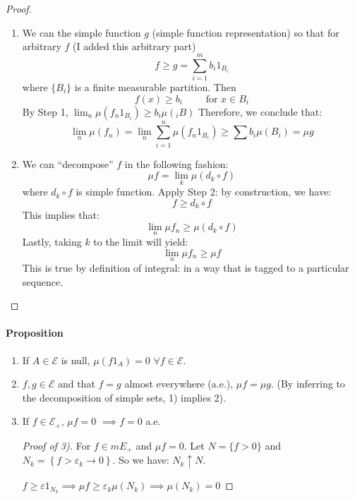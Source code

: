 \documentclass[11pt]{article}
\newcommand{\m}{\mathcal}
\renewcommand{\epsilon}{\varepsilon}
\begin{document}
\begin{proof}
\begin{enumerate}[Step 1]
            \item We can  the simple function $g$ (simple function representation) so
              that  for arbitrary $f$ (I added this arbitrary part)
              \[ f \ge g = \sum_{i=1}^m b_i 1_{B_i}
              \]
              where $\{B_i\}$  is a finite measurable partition.  Then
              \[f(x) \ge b_i \qquad \text{ for } x \in B_i
              \]
              By Step 1, 
              $\lim _n \mu (f_n 1_{B_i}) \ge b_i \mu(_iB)$
              Therefore, we conclude that: 
              \[
                \lim_n \mu(f_n) = \lim_n \sum_{i=1}^n \mu (f_n 1_{B_i}) \ge \sum b_i
                \mu(B_i)= \mu g
              \]
            \item We can ``decompose'' $f$ in the following fashion: 
              \[
                \mu f = \lim_k \mu ( d _k \circ f) 
              \]
              where $d_k \circ f$ is simple function. Apply Step 2: by construction,
              we have: 
              \[
                f \ge d_k \circ f 
              \]
              This implies that: 
              \[
                \lim _n \mu f_n \ge \mu(d_k \circ f)
              \]
              Lastly, taking $k$ to the limit will yield: 
              \[
                \lim _n \mu f_n \ge \mu f
              \]
              This is true by definition of integral: in a way that is tagged to a
              particular sequence.

          \end{enumerate} 
        \end{proof}

        \paragraph{Proposition}  \label{Prop:}
        \begin{enumerate}[1)]
          \item If $A \in \m E$ is null, $\mu (f 1 _ A) = 0$ $\forall f \in \m E$.
          \item $f , g \in \m E$ and that $f = g$ almost everywhere (a.e.), $\mu f = \mu
            g$. (By inferring to the decomposition of simple sets, 1) implies 2).
          \item If $f \in \m E_+$, $\mu f = 0$ $\implies f = 0$ a.e. 
            \begin{proof}[Proof of 3)]
              For $f \in mE _+$ and $\mu f = 0$. Let $N  = \{ f >0 \}$ and $N_k =
              \left\{ f > \epsilon _k \to 0 \right\}$. So we have: $N_k \uparrow N$. 


              $f \ge \epsilon 1 _{N_k} \implies \mu f \ge \epsilon_k \mu(N_k) \implies
              \mu(N_k) = 0
              $
            \end{proof}
        \end{enumerate}
\end{document}
